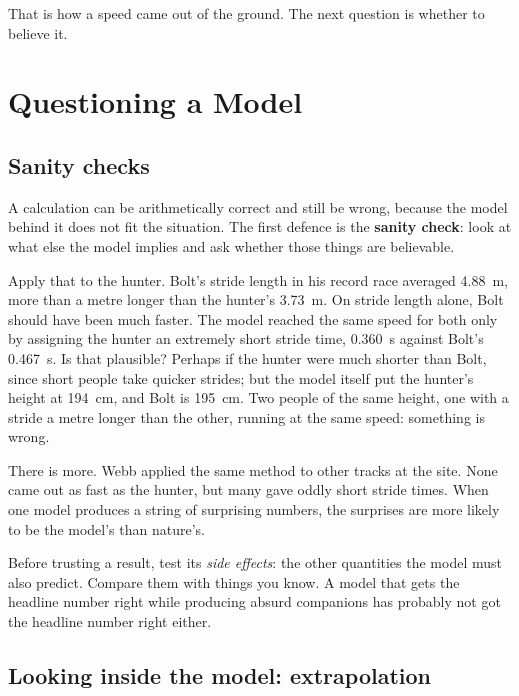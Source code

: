 \documentclass[11pt,twoside,openany]{book}
\newcounter{check}[chapter]
\begin{document}
That is how a speed came out of the ground. The next question is whether to believe it.

\section{Questioning a Model}

\subsection{Sanity checks}

A calculation can be arithmetically correct and still be wrong, because the model behind it does not fit the situation. The first defence is the \textbf{sanity check}: look at what else the model implies and ask whether those things are believable.

Apply that to the hunter. Bolt's stride length in his record race averaged \SI{4.88}{\metre}, more than a metre longer than the hunter's \SI{3.73}{\metre}. On stride length alone, Bolt should have been much faster. The model reached the same speed for both only by assigning the hunter an extremely short stride time, \SI{0.360}{\second} against Bolt's \SI{0.467}{\second}. Is that plausible? Perhaps if the hunter were much shorter than Bolt, since short people take quicker strides; but the model itself put the hunter's height at \SI{194}{\centi\metre}, and Bolt is \SI{195}{\centi\metre}. Two people of the same height, one with a stride a metre longer than the other, running at the same speed: something is wrong.

There is more. Webb applied the same method to other tracks at the site. None came out as fast as the hunter, but many gave oddly short stride times. When one model produces a string of surprising numbers, the surprises are more likely to be the model's than nature's.

\begin{keyidea}
Before trusting a result, test its \emph{side effects}: the other quantities the model must also predict. Compare them with things you know. A model that gets the headline number right while producing absurd companions has probably not got the headline number right either.
\end{keyidea}

\subsection{Looking inside the model: extrapolation}
\end{document}
